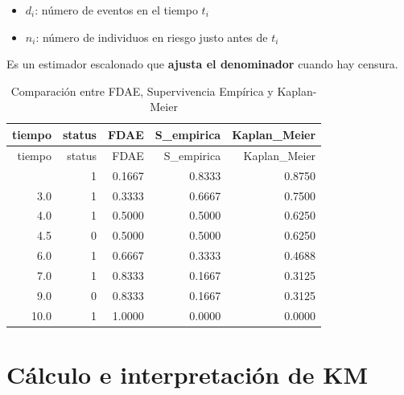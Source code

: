 \documentclass[
]{article}
\providecommand{\tightlist}{%
  \setlength{\itemsep}{0pt}\setlength{\parskip}{0pt}}
\begin{document}
\begin{itemize}
\tightlist
\item
  \(d_i\): número de eventos en el tiempo \(t_i\)
\item
  \(n_i\): número de individuos en riesgo justo antes de \(t_i\)
\end{itemize}

Es un estimador escalonado que \textbf{ajusta el denominador} cuando hay
censura.

\begin{tcolorbox}[enhanced jigsaw, colbacktitle=quarto-callout-note-color!10!white, bottomtitle=1mm, toptitle=1mm, title=\textcolor{quarto-callout-note-color}{\faInfo}\hspace{0.5em}{Ejemplo}, opacitybacktitle=0.6, bottomrule=.15mm, colback=white, opacityback=0, left=2mm, toprule=.15mm, coltitle=black, rightrule=.15mm, leftrule=.75mm, titlerule=0mm, arc=.35mm, colframe=quarto-callout-note-color-frame, breakable]

\begin{longtable}[]{@{}rrrrr@{}}
\caption{Comparación entre FDAE, Supervivencia Empírica y
Kaplan-Meier}\tabularnewline
\toprule\noalign{}
tiempo & status & FDAE & S\_empirica & Kaplan\_Meier \\
\midrule\noalign{}
\endfirsthead
\toprule\noalign{}
tiempo & status & FDAE & S\_empirica & Kaplan\_Meier \\
\midrule\noalign{}
\endhead
\bottomrule\noalign{}
\endlastfoot
2.0 & 1 & 0.1667 & 0.8333 & 0.8750 \\
3.0 & 1 & 0.3333 & 0.6667 & 0.7500 \\
4.0 & 1 & 0.5000 & 0.5000 & 0.6250 \\
4.5 & 0 & 0.5000 & 0.5000 & 0.6250 \\
6.0 & 1 & 0.6667 & 0.3333 & 0.4688 \\
7.0 & 1 & 0.8333 & 0.1667 & 0.3125 \\
9.0 & 0 & 0.8333 & 0.1667 & 0.3125 \\
10.0 & 1 & 1.0000 & 0.0000 & 0.0000 \\
\end{longtable}

\end{tcolorbox}

\section{Cálculo e interpretación de
KM}\label{cuxe1lculo-e-interpretaciuxf3n-de-km}
\end{document}
